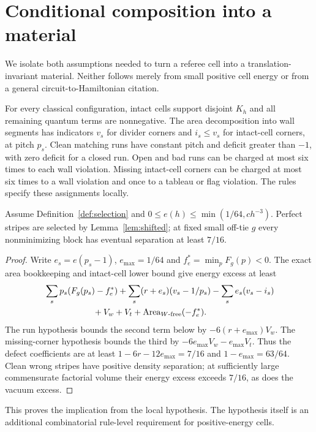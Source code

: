 \section{Conditional composition into a material}\label{sec:conditional}
We isolate both assumptions needed to turn a referee cell into a
translation-invariant material. Neither follows merely from small
positive cell energy or from a general circuit-to-Hamiltonian citation.

\begin{definition}\label{def:selection}
For every classical configuration, intact cells support disjoint
$K_h$ and all remaining quantum terms are nonnegative. The area
decomposition into wall segments has indicators $v_s$ for divider
corners and $i_s\leq v_s$ for intact-cell corners, at pitch $p_s$.
Clean matching runs have constant pitch and deficit greater than $-1$,
with zero deficit for a closed run. Open and bad runs can be charged
at most six times to each wall violation. Missing intact-cell corners
can be charged at most six times to a wall violation and once to a
tableau or flag violation. The rules specify these assignments locally.
\end{definition}

\begin{lemma}\label{lem:positive-selection}
Assume Definition~\ref{def:selection} and
$0\leq e(h)\leq\min(1/64,ch^{-3})$. Perfect stripes are selected
by Lemma~\ref{lem:shifted}; at fixed small off-tie $g$ every
nonminimizing block has eventual separation at least $7/16$.
\end{lemma}
\begin{proof}
Write $e_s=e(p_s-1)$, $e_{\max}=1/64$ and
$f^*_e=\min_pF_g(p)<0$. The exact area bookkeeping and intact-cell
lower bound give energy excess at least
\begin{align*}
 &\sum_s p_s(F_g(p_s)-f^*_e)
 +\sum_s(r+e_s)(v_s-1/p_s)-\sum_s e_s(v_s-i_s)\\
 &\hspace{20mm}+V_w+V_t+\operatorname{Area}_{W\text{-free}}(-f^*_e).
\end{align*}
The run hypothesis bounds the second term below by
$-6(r+e_{\max})V_w$. The missing-corner hypothesis bounds the third
by $-6e_{\max}V_w-e_{\max}V_t$. Thus the defect coefficients are
at least $1-6r-12e_{\max}=7/16$ and
$1-e_{\max}=63/64$. Clean wrong stripes have positive density
separation; at sufficiently large commensurate factorial volume their
energy excess exceeds $7/16$, as does the vacuum excess.
\end{proof}
This proves the implication from the local hypothesis. The hypothesis
itself is an additional combinatorial rule-level requirement for
positive-energy cells.

